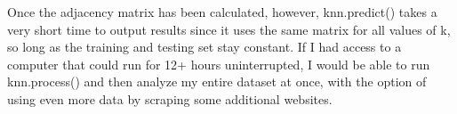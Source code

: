 \documentclass[]{article}
\begin{document}
		Once the adjacency matrix has been calculated, however, knn.predict() takes a very short time to output results since it uses the same matrix for all values of k, so long as the training and testing set stay constant. If I had access to a computer that could run for 12+ hours uninterrupted, I would be able to run knn.process() and then analyze my entire dataset at once, with the option of using even more data by scraping some additional websites.
		
		
		
		
		
		
		
		
	
	
\end{document}
